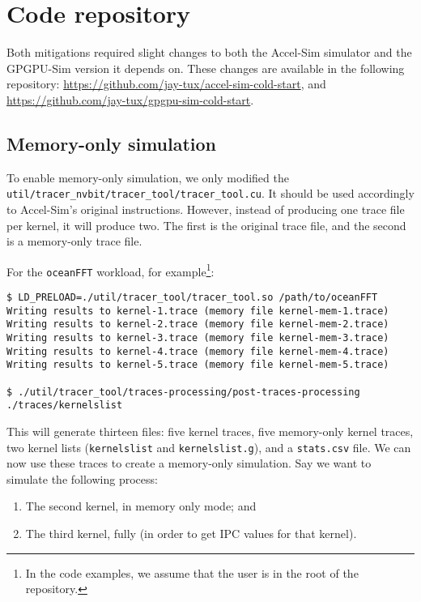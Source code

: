 \newcommand{\ghlink}[1]{\href{#1}{#1}}

\chapter{Code repository}\label{ch:repo}
Both mitigations required slight changes to both the Accel-Sim simulator and the GPGPU-Sim version it depends on.
These changes are available in the following repository: \ghlink{https://github.com/jay-tux/accel-sim-cold-start}, and \ghlink{https://github.com/jay-tux/gpgpu-sim-cold-start}.

\section{Memory-only simulation}\label{sec:repo-mem-only}
To enable memory-only simulation, we only modified the \verb|util/tracer_nvbit/tracer_tool/tracer_tool.cu|.
It should be used accordingly to Accel-Sim's original instructions.
However, instead of producing one trace file per kernel, it will produce two.
The first is the original trace file, and the second is a memory-only trace file.

For the \verb|oceanFFT| workload, for example\footnote{In the code examples, we assume that the user is in the root of the repository.}:
\begin{verbatim}
$ LD_PRELOAD=./util/tracer_tool/tracer_tool.so /path/to/oceanFFT
Writing results to kernel-1.trace (memory file kernel-mem-1.trace)
Writing results to kernel-2.trace (memory file kernel-mem-2.trace)
Writing results to kernel-3.trace (memory file kernel-mem-3.trace)
Writing results to kernel-4.trace (memory file kernel-mem-4.trace)
Writing results to kernel-5.trace (memory file kernel-mem-5.trace)

$ ./util/tracer_tool/traces-processing/post-traces-processing ./traces/kernelslist
\end{verbatim}

This will generate thirteen files: five kernel traces, five memory-only kernel traces, two kernel lists (\verb|kernelslist| and \verb|kernelslist.g|), and a \verb|stats.csv| file.
We can now use these traces to create a memory-only simulation.
Say we want to simulate the following process:
\begin{enumerate}
    \item The second kernel, in memory only mode; and
    \item The third kernel, fully (in order to get IPC values for that kernel).
\end{enumerate}

